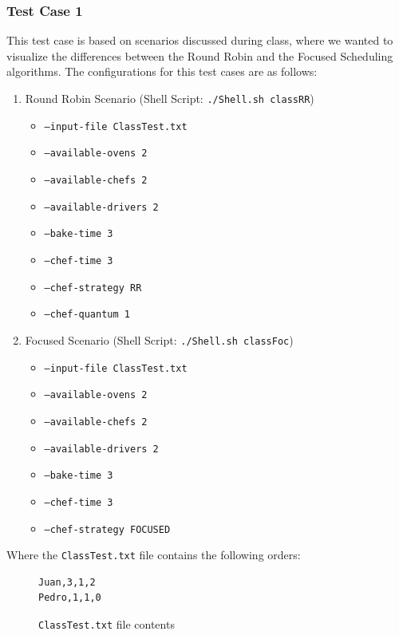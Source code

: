\documentclass[conference]{IEEEtran}
\begin{document}
\subsubsection{Test Case 1}
This test case is based on scenarios discussed during class, where we wanted to visualize the differences between the Round Robin and the Focused Scheduling algorithms. The configurations for this test cases are as follows:
\begin{enumerate}
    \item Round Robin Scenario (Shell Script: \texttt{./Shell.sh classRR})
    \begin{itemize}
        \item \texttt{--input-file ClassTest.txt}
        \item \texttt{--available-ovens 2}
        \item \texttt{--available-chefs 2} 
        \item \texttt{--available-drivers 2}
        \item \texttt{--bake-time 3}
        \item \texttt{--chef-time 3}
        \item \texttt{--chef-strategy RR}
        \item \texttt{--chef-quantum 1}
    \end{itemize}
    \item Focused Scenario (Shell Script: \texttt{./Shell.sh classFoc})
    \begin{itemize}
        \item \texttt{--input-file ClassTest.txt}
        \item \texttt{--available-ovens 2}
        \item \texttt{--available-chefs 2} 
        \item \texttt{--available-drivers 2}
        \item \texttt{--bake-time 3}
        \item \texttt{--chef-time 3}
        \item \texttt{--chef-strategy FOCUSED}
    \end{itemize}
\end{enumerate}

Where the \texttt{ClassTest.txt} file contains the following orders:
\begin{figure}[H]
    \centering
    \begin{lstlisting}[style=input,frame=single]
Juan,3,1,2
Pedro,1,1,0
    \end{lstlisting}
    \caption{\centering \texttt{ClassTest.txt} file contents}
    \label{fig:orders}
\end{figure}
\end{document}
